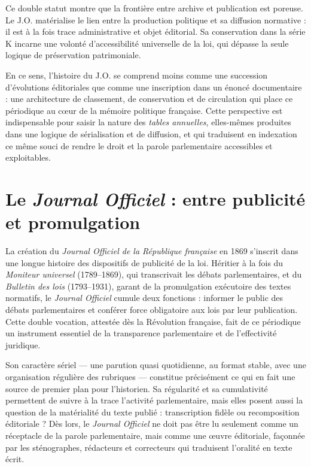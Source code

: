 Ce double statut montre que la frontière entre archive et publication est poreuse. Le J.O. matérialise le lien entre la production politique et sa diffusion normative : il est à la fois trace administrative et objet éditorial. Sa conservation dans la série K incarne une volonté d’accessibilité universelle de la loi, qui dépasse la seule logique de préservation patrimoniale.

En ce sens, l’histoire du J.O. se comprend moins comme une succession d’évolutions éditoriales que comme une inscription dans un énoncé documentaire : une architecture de classement, de conservation et de circulation qui place ce périodique au cœur de la mémoire politique française. Cette perspective est indispensable pour saisir la nature des \emph{tables annuelles}, elles-mêmes produites dans une logique de sérialisation et de diffusion, et qui traduisent en indexation ce même souci de rendre le droit et la parole parlementaire accessibles et exploitables.

\section{Le \emph{Journal Officiel} : entre publicité et promulgation}

La création du \emph{Journal Officiel de la République française} en 1869 s’inscrit dans une longue histoire des dispositifs de publicité de la loi. Héritier à la fois du \emph{Moniteur universel} (1789–1869), qui transcrivait les débats parlementaires, et du \emph{Bulletin des lois} (1793–1931), garant de la promulgation exécutoire des textes normatifs, le \emph{Journal Officiel} cumule deux fonctions : informer le public des débats parlementaires et conférer force obligatoire aux lois par leur publication. Cette double vocation, attestée dès la Révolution française, fait de ce périodique un instrument essentiel de la transparence parlementaire et de l’effectivité juridique.

Son caractère sériel — une parution quasi quotidienne, au format stable, avec une organisation régulière des rubriques — constitue précisément ce qui en fait une source de premier plan pour l’historien. Sa régularité et sa cumulativité permettent de suivre à la trace l’activité parlementaire, mais elles posent aussi la question de la matérialité du texte publié : transcription fidèle ou recomposition éditoriale ? Dès lors, le \emph{Journal Officiel} ne doit pas être lu seulement comme un réceptacle de la parole parlementaire, mais comme une œuvre éditoriale, façonnée par les sténographes, rédacteurs et correcteurs qui traduisent l’oralité en texte écrit.

